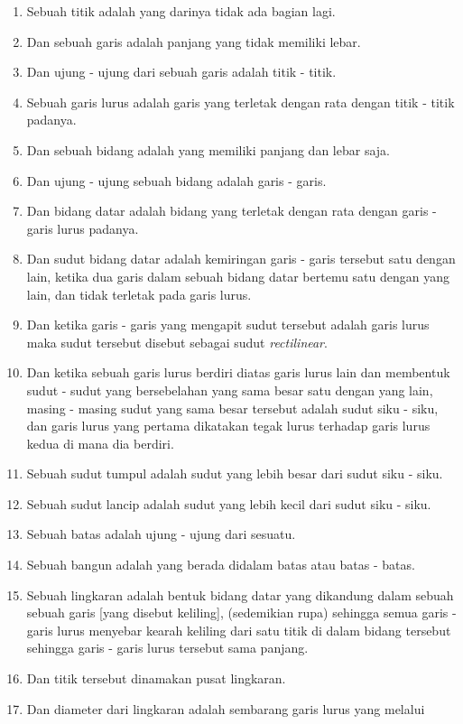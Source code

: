 \documentclass[a4paper, 12pt]{book}
\begin{document}
\begin{enumerate}
\item Sebuah titik adalah yang darinya tidak ada bagian lagi.
\item Dan sebuah garis adalah panjang yang tidak memiliki lebar.
\item Dan ujung - ujung dari sebuah garis adalah titik - titik.
\item Sebuah garis lurus adalah garis yang terletak dengan rata dengan titik - titik padanya.
\item Dan sebuah bidang adalah yang memiliki panjang dan lebar saja.
\item Dan ujung - ujung sebuah bidang adalah garis - garis.
\item Dan bidang datar adalah bidang yang terletak dengan rata dengan garis - garis lurus padanya.
\item Dan sudut bidang datar adalah kemiringan garis - garis tersebut 
satu dengan lain, ketika dua garis dalam sebuah bidang datar bertemu satu dengan
yang lain, dan tidak terletak pada garis lurus.
\item Dan ketika garis - garis yang mengapit sudut tersebut adalah garis lurus maka sudut
tersebut disebut sebagai sudut \textit{rectilinear}.
\item Dan ketika sebuah garis lurus berdiri diatas garis lurus lain dan 
membentuk sudut - sudut yang bersebelahan yang sama besar satu dengan yang 
lain, masing - masing sudut yang sama besar tersebut adalah sudut siku - siku,
dan garis lurus yang pertama dikatakan tegak lurus terhadap garis lurus kedua
di mana dia berdiri.
\item Sebuah sudut tumpul adalah sudut yang lebih besar dari sudut siku - siku.
\item Sebuah sudut lancip adalah sudut yang lebih kecil dari sudut siku - siku.
\item Sebuah batas adalah ujung - ujung dari sesuatu.
\item Sebuah bangun adalah yang berada didalam batas atau batas - batas.
\item Sebuah lingkaran adalah bentuk bidang datar yang dikandung dalam sebuah 
sebuah garis [yang disebut keliling], (sedemikian rupa) sehingga semua 
garis - garis lurus menyebar kearah keliling dari satu titik di dalam bidang
tersebut sehingga garis - garis lurus tersebut sama panjang.
\item Dan titik tersebut dinamakan pusat lingkaran.
\item Dan diameter dari lingkaran adalah sembarang garis lurus yang melalui 

\end{enumerate}
\end{document}
